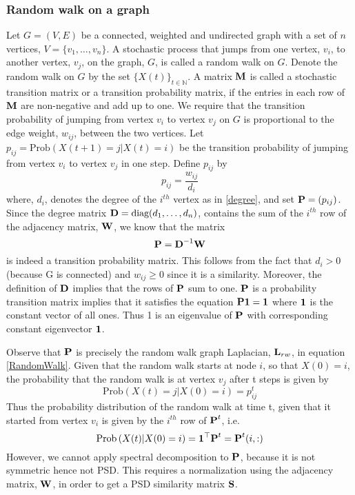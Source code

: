 \subsubsection{Random walk on a graph}
Let $G=(V,E)$ be a connected, weighted and undirected graph with a set of $n$ vertices, $V = \{v_{1}, \dots, v_{n} \}$.
A stochastic process that jumps from one vertex, $v_{i}$, to another vertex, $v_{j}$, on the graph, $G$, is called a random walk on $G$.
Denote the random walk on $G$ by the set $\{X(t)\}_{t \in \mathbb{N}}$.
A matrix $\textbf{M}$ is called a stochastic transition matrix or a transition probability matrix, if the entries in each row of $\textbf{M}$ are non-negative and add up to one.
We require that the transition probability of jumping from vertex $v_{i}$
to vertex $v_{j}$ on $G$ is proportional to the edge weight, $w_{ij}$, between the two vertices. 
Let $p_{ij} = \text{Prob} \left(X(t+1) = j | X(t) = i \right)$ be the transition probability of jumping from vertex $v_{i}$ to vertex $v_{j}$ in one step. Define $p_{ij}$ by
\begin{equation}
p_{ij}   = \frac{w_{ij}}{d_{i}}
\end{equation}
where, $d_{i}$,  denotes the degree of the $i^{th}$ vertex as in \eqref{degree}, and 
set $\textbf{P} = (p_{ij})$. Since the degree matrix $\textbf{D} = \text{diag}(d_{1}, \ldots, d_{n})$, contains the sum of the $i^{th}$ row of the adjacency matrix, $\textbf{W}$,
we know that the matrix 
\begin{equation}\label{transitmatrix}
\textbf{P} = \textbf{D}^{-1}\textbf{W} 
\end{equation}
is indeed a transition probability matrix. This follows from the fact that $d_{i} > 0$ (because G is connected) and $w_{ij} \geq 0$ since it is a similarity. Moreover, the definition of $\textbf{D}$ implies that the rows of $\textbf{P}$ sum to one. 
$\textbf{P}$ is a probability transition matrix implies that it satisfies
the equation $\textbf{P} \boldsymbol{1} = \boldsymbol{1}$ where $\boldsymbol{1}$ is the constant vector of all ones. Thus 1 is an eigenvalue of $\textbf{P}$ with corresponding constant eigenvector $\boldsymbol{1}$.

Observe that $\textbf{P}$ is precisely the random walk graph Laplacian, $\textbf{L}_{rw}$, in equation \eqref{RandomWalk}.
Given that the random walk starts at node $i$, so that $X(0) = i$, the probability
that the random walk is at vertex $v_{j}$ after t steps is given by
\[
\text{Prob}\left( X(t) = j | X(0) = i  \right) = p_{ij}^{t}
\]
Thus the probability distribution of the random walk at time t, given that it started from vertex $v_{i}$ is given by the  $i^{th}$ row of $\textbf{P}^{t}$, i.e.
\begin{equation}\label{pdftime}
\text{Prob}\left( X(t) | X(0) = i  \right) = \boldsymbol{1}^{\top}\textbf{P}^{t} = \textbf{P}^{t}(i, :)
\end{equation}
However, we cannot apply spectral decomposition to $\textbf{P}$, because it is
not symmetric hence not PSD.
This requires a normalization using the adjacency matrix, $\textbf{W}$, in order
to get a PSD similarity matrix $\textbf{S}$.

